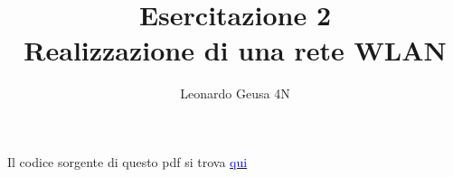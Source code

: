 \documentclass[12pt]{article}
\begin{document}
\title{%
  Esercitazione 2 \\
  \large Realizzazione di una rete WLAN}
\date{}
\author{Leonardo Geusa 4N}
\setcounter{section}{-1}
\maketitle



\vspace{30pt}

\tableofcontents

\raggedright











\newpage







\newpage



\vspace{100pt}
Il codice sorgente di questo pdf si trova \href{https://github.com/Leoooog/Esercitazione2}{\textcolor{blue}{qui}}
\end{document}
